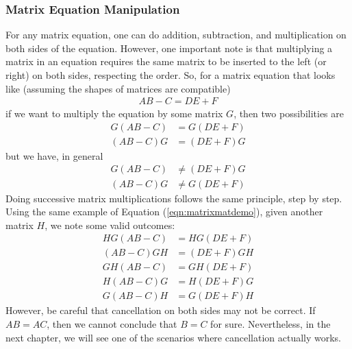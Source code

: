 \subsubsection{Matrix Equation Manipulation}
For any matrix equation, one can do addition, subtraction, and multiplication on both sides of the equation. However, one important note is that multiplying a matrix in an equation requires the same matrix to be inserted to the left (or right) on both sides, respecting the order. So, for a matrix equation that looks like (assuming the shapes of matrices are compatible)
\begin{align}
AB-C = DE+F \label{eqn:matrixmatdemo}
\end{align}
if we want to multiply the equation by some matrix $G$, then two possibilities are
\begin{align*}
G(AB-C) &= G(DE+F) \\
(AB-C)G &= (DE+F)G
\end{align*}
but we have, in general
\begin{align*}
G(AB-C) &\neq (DE+F)G \\
(AB-C)G &\neq G(DE+F)
\end{align*}
Doing successive matrix multiplications follows the same principle, step by step. Using the same example of Equation (\ref{eqn:matrixmatdemo}), given another matrix $H$, we note some valid outcomes:
\begin{align*}
HG(AB-C) &= HG(DE+F) \\
(AB-C)GH &= (DE+F)GH \\
GH(AB-C) &= GH(DE+F) \\
H(AB-C)G &= H(DE+F)G \\
G(AB-C)H &= G(DE+F)H 
\end{align*}
However, be careful that cancellation on both sides may not be correct. If $AB = AC$, then we cannot conclude that $B = C$ for sure. Nevertheless, in the next chapter, we will see one of the scenarios where cancellation actually works.

